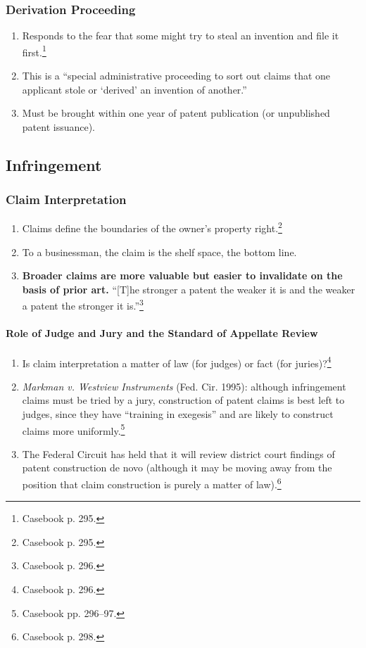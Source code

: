 \subsubsection{Derivation Proceeding}

\begin{enumerate}
    \item Responds to the fear that some might try to steal an invention and 
    file it first.\footnote{Casebook p. 295.}
    \item This is a ``special administrative proceeding to sort out claims that 
    one applicant stole or `derived' an invention of another.''
    \item Must be brought within one year of patent publication (or unpublished 
    patent issuance).
\end{enumerate}

\subsection{Infringement}

\subsubsection{Claim Interpretation}

\begin{enumerate}
    \item Claims define the boundaries of the owner's property 
    right.\footnote{Casebook p. 295.}
    \item To a businessman, the claim is the shelf space, the bottom line.
    \item \textbf{Broader claims are more valuable but easier to invalidate on 
    the basis of prior art.} ``[T]he stronger a patent the weaker it is and the 
    weaker a patent the stronger it is.''\footnote{Casebook p. 296.}
\end{enumerate}

\paragraph{Role of Judge and Jury and the Standard of Appellate Review}

\begin{enumerate}
    \item Is claim interpretation a matter of law (for judges) or fact (for 
    juries)?\footnote{Casebook p. 296.}
    \item \emph{Markman v. Westview Instruments} (Fed. Cir. 1995): although 
    infringement claims must be tried by a jury, construction of patent claims 
    is best left to judges, since they have ``training in exegesis'' and are 
    likely to construct claims more uniformly.\footnote{Casebook pp. 296--97.}
    \item The Federal Circuit has held that it will review district court 
    findings of patent construction de novo (although it may be moving away from 
    the position that claim construction is purely a matter of 
    law).\footnote{Casebook p. 298.}
\end{enumerate}

